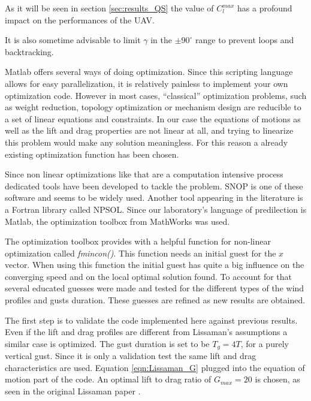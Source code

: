 As it will be seen in section \ref{sec:results_QS} the value of $C_l^{max}$ has a profound impact on the performances of the UAV.

\par It is also sometime advisable to limit $\gamma$ in the $\pm 90^{\circ}$ range to prevent loops and backtracking.


Matlab offers several ways of doing optimization.
Since this scripting language allows for easy parallelization, it is relatively painless to implement your own optimization code.
However in most cases, ``classical'' optimization problems, such as weight reduction, topology optimization or mechanism design are reducible to a set of linear  equations and constraints.
In our case the equations of motions as well as the lift and drag properties are not linear at all, and trying to linearize this problem would make any solution meaningless.
For this reason a already existing optimization function has been chosen.

\par Since non linear optimizations like that are a computation intensive process dedicated tools have been developed to tackle the problem.
SNOP is one of these software and seems to be widely used.
Another tool appearing in the literature is a Fortran library called NPSOL.
Since our laboratory's language of predilection is Matlab, the optimization toolbox from MathWorks was used.

\par The optimization toolbox provides with a helpful function for non-linear optimization called \emph{fmincon()}.
This function needs an initial guest for the $x$ vector.
When using this function the initial guest has quite a big influence on the converging speed and on the local optimal solution found.
To account for that several educated guesses were made and tested for the different types of the wind profiles and gusts duration.
These guesses are refined as new results are obtained.


 \label{sec:results_QS}

The first step is to validate the code implemented here against previous results. 
Even if the lift and drag profiles are different from Lissaman's assumptions a similar case is optimized.
The gust duration is set to be $T_g=4 T$, for a purely vertical gust.
Since it is only a validation test the same lift and drag characteristics are used. Equation \ref{eqn:Lissaman_G} plugged into the equation of motion part of the code. An optimal lift to drag ratio of $G_{max}=20$ is chosen, as seen in the original Lissaman paper \cite{Lissaman2007neutral}.


